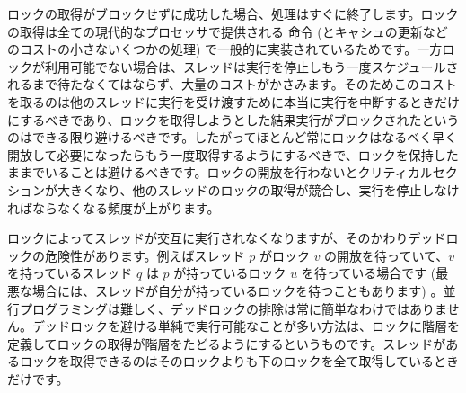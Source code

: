 ロックの取得がブロックせずに成功した場合、処理はすぐに終了します。ロックの取得は全ての現代的なプロセッサで提供される  命令 (とキャシュの更新などのコストの小さないくつかの処理) で一般的に実装されているためです。一方ロックが利用可能でない場合は、スレッドは実行を停止しもう一度スケジュールされるまで待たなくてはならず、大量のコストがかさみます。そのためこのコストを取るのは他のスレッドに実行を受け渡すために本当に実行を中断するときだけにするべきであり、ロックを取得しようとした結果実行がブロックされたというのはできる限り避けるべきです。したがってほとんど常にロックはなるべく早く開放して必要になったらもう一度取得するようにするべきで、ロックを保持したままでいることは避けるべきです。ロックの開放を行わないとクリティカルセクションが大きくなり、他のスレッドのロックの取得が競合し、実行を停止しなければならなくなる頻度が上がります。

ロックによってスレッドが交互に実行されなくなりますが、そのかわりデッドロックの危険性があります。例えばスレッド $p$ がロック $v$ の開放を待っていて、$v$ を持っているスレッド $q$ は $p$ が持っているロック $u$ を待っている場合です (最悪な場合には、スレッドが自分が持っているロックを待つこともあります) 。並行プログラミングは難しく、デッドロックの排除は常に簡単なわけではありません。デッドロックを避ける単純で実行可能なことが多い方法は、ロックに階層を定義してロックの取得が階層をたどるようにするというものです。スレッドがあるロックを取得できるのはそのロックよりも下のロックを全て取得しているときだけです。

